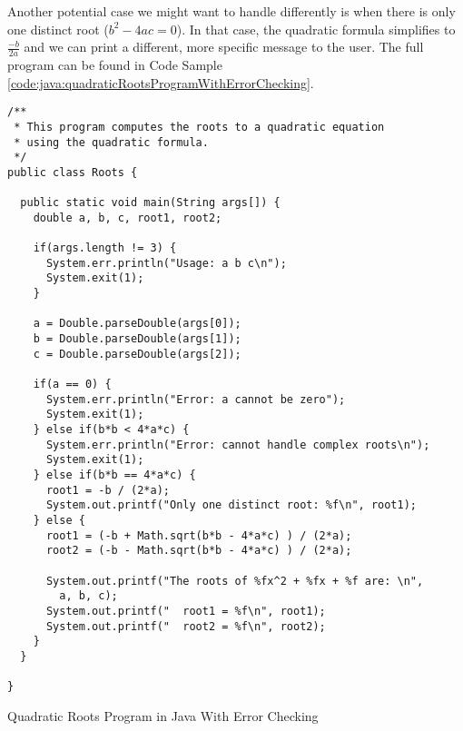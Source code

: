Another potential case we might want to handle differently is when there is only
one distinct root ($b^2 - 4ac = 0$).  In that case, the quadratic formula simplifies 
to $\frac{-b}{2a}$ and we can print a different, more specific message to the user.
The full program can be found in Code Sample \ref{code:java:quadraticRootsProgramWithErrorChecking}.

\begin{listing}[h]
\begin{verbatim}
/**
 * This program computes the roots to a quadratic equation
 * using the quadratic formula.
 */
public class Roots {

  public static void main(String args[]) {
    double a, b, c, root1, root2;

    if(args.length != 3) {
      System.err.println("Usage: a b c\n");
      System.exit(1);
    }

    a = Double.parseDouble(args[0]);
    b = Double.parseDouble(args[1]);
    c = Double.parseDouble(args[2]);
    
    if(a == 0) {
      System.err.println("Error: a cannot be zero");
      System.exit(1);
    } else if(b*b < 4*a*c) {
      System.err.println("Error: cannot handle complex roots\n");
      System.exit(1);
    } else if(b*b == 4*a*c) {
      root1 = -b / (2*a);
      System.out.printf("Only one distinct root: %f\n", root1);
    } else {
      root1 = (-b + Math.sqrt(b*b - 4*a*c) ) / (2*a);
      root2 = (-b - Math.sqrt(b*b - 4*a*c) ) / (2*a);
    
      System.out.printf("The roots of %fx^2 + %fx + %f are: \n", 
      	a, b, c);
      System.out.printf("  root1 = %f\n", root1);
      System.out.printf("  root2 = %f\n", root2);
    }
  }

}
\end{verbatim}
\caption{Quadratic Roots Program in Java With Error Checking}
\label{code:java:quadraticRootsProgramWithErrorChecking}
\end{listing}
